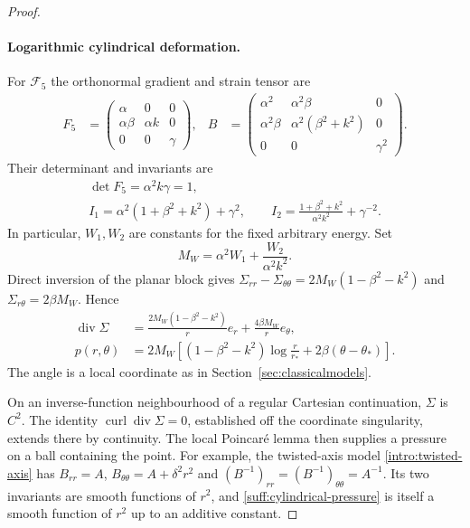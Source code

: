 \documentclass[11pt,a4paper]{article}
\numberwithin{equation}{section}
\theoremstyle{plain}
\theoremstyle{definition}
\theoremstyle{remark}
\begin{document}
\begin{proof}
\paragraph{Logarithmic cylindrical deformation.}
For $\mathcal F_5$ the orthonormal gradient and strain tensor are
\begin{equation}\label{suff:logarithmic-gradient}
 \begin{aligned}
 F_5&=
 \begin{pmatrix}
 \alpha&0&0\\
 \alpha\beta&\alpha k&0\\
 0&0&\gamma
 \end{pmatrix},&
 B&=
 \begin{pmatrix}
 \alpha^2&\alpha^2\beta&0\\
 \alpha^2\beta&\alpha^2(\beta^2+k^2)&0\\
 0&0&\gamma^2
 \end{pmatrix}.
 \end{aligned}
\end{equation}
Their determinant and invariants are
\begin{equation}\label{suff:logarithmic-invariants}
 \begin{gathered}
 \det F_5=\alpha^2k\gamma=1,\\
 I_1=\alpha^2(1+\beta^2+k^2)+\gamma^2,\qquad
 I_2=\frac{1+\beta^2+k^2}{\alpha^2k^2}+\gamma^{-2}.
 \end{gathered}
\end{equation}
In particular, $W_1,W_2$ are constants for the fixed arbitrary energy.
Set
\begin{equation}\label{suff:logarithmic-coefficient}
 M_W=\alpha^2W_1+\frac{W_2}{\alpha^2k^2}.
\end{equation}
Direct inversion of the planar block gives
$\Sigma_{rr}-\Sigma_{\theta\theta}=2M_W(1-\beta^2-k^2)$ and
$\Sigma_{r\theta}=2\beta M_W$.  Hence
\begin{equation}\label{suff:logarithmic-pressure}
 \begin{aligned}
 \operatorname{div}\Sigma
  &=\frac{2M_W(1-\beta^2-k^2)}r e_r
       +\frac{4\beta M_W}r e_\theta,\\
 p(r,\theta)
  &=2M_W\left[
     (1-\beta^2-k^2)\log\frac r{r_*}
       +2\beta(\theta-\theta_*)\right].
 \end{aligned}
\end{equation}
The angle is a local coordinate as in Section~\ref{sec:classicalmodels}.

On an inverse-function neighbourhood of a regular Cartesian continuation, $\Sigma$ is $C^2$.  The identity
$\operatorname{curl}\operatorname{div}\Sigma=0$, established off the
coordinate singularity, extends there by continuity.  The local
Poincar\'e lemma then supplies a pressure on a ball containing the point.
For example, the twisted-axis model \eqref{intro:twisted-axis} has
$B_{rr}=A$, $B_{\theta\theta}=A+\delta^2r^2$ and
$(B^{-1})_{rr}=(B^{-1})_{\theta\theta}=A^{-1}$.
Its two invariants are smooth functions of $r^2$, and
\eqref{suff:cylindrical-pressure} is itself a smooth function of $r^2$
up to an additive constant.
\end{proof}
\end{document}
